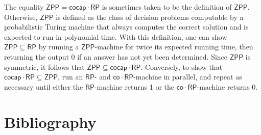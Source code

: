 \documentclass[12pt]{article}
\theoremstyle{definition}
\theoremstyle{remark}
\newcommand{\co}{\mathsf{co}}
\newcommand{\cocap}{\mathsf{cocap}}
\newcommand{\msf}[1]{\mathsf{#1}}
\begin{document}
The equality $\msf{ZPP} = \cocap\cdot\msf{RP}$ is sometimes taken to be the
definition of $\msf{ZPP}$. Otherwise, $\msf{ZPP}$ is defined as the class of
decision problems computable by a probabilistic Turing machine that always
computes the correct solution and is expected to run in polynomial-time. With
this definition, one can show $\msf{ZPP}\subseteq\msf{RP}$ by running a
$\msf{ZPP}$-machine for twice its expected running time, then returning the
output 0 if an answer has not yet been determined. Since $\msf{ZPP}$ is
symmetric, it follows that $\msf{ZPP}\subseteq\cocap\cdot\msf{RP}$. Conversely, to
show that $\cocap\cdot\msf{RP}\subseteq\msf{ZPP}$, run an $\msf{RP}$- and
$\co\cdot\msf{RP}$-machine in parallel, and repeat as necessary until either the
$\msf{RP}$-machine returns 1 or the $\co\cdot\msf{RP}$-machine returns 0.

\section{Bibliography}

\nocite{*}


\end{document}
